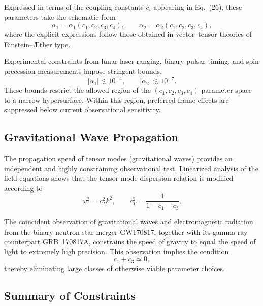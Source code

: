 \documentclass[11pt]{article}
\begin{document}
        Expressed in terms of the coupling constants $c_i$ appearing in
        Eq.~(26), these parameters take the schematic form
        \begin{equation}
            \alpha_1 = \alpha_1(c_1,c_2,c_3,c_4), \qquad
            \alpha_2 = \alpha_2(c_1,c_2,c_3,c_4),
        \end{equation}
        where the explicit expressions follow those obtained in vector--tensor
        theories of Einstein--Æther type.

        Experimental constraints from lunar laser ranging, binary pulsar timing, and
        spin precession measurements impose stringent bounds,
        \begin{equation}
            |\alpha_1| \lesssim 10^{-4}, \qquad
            |\alpha_2| \lesssim 10^{-7}.
        \end{equation}
        These bounds restrict the allowed region of the $(c_1,c_2,c_3,c_4)$ parameter
        space to a narrow hypersurface.
        Within this region, preferred-frame effects are suppressed below current
        observational sensitivity.

    \subsection{Gravitational Wave Propagation}

        The propagation speed of tensor modes (gravitational waves) provides an
        independent and highly constraining observational test.
        Linearized analysis of the field equations shows that the tensor-mode dispersion
        relation is modified according to
        \begin{equation}
            \omega^2 = c_T^2 k^2, \qquad
            c_T^2 = \frac{1}{1 - c_1 - c_3}.
        \end{equation}

        The coincident observation of gravitational waves and electromagnetic radiation
        from the binary neutron star merger GW170817, together with its gamma-ray
        counterpart GRB~170817A, constrains the speed of gravity to equal the speed of
        light to extremely high precision.
        This observation implies the condition
        \begin{equation}
            c_1 + c_3 \simeq 0,
        \end{equation}
        thereby eliminating large classes of otherwise viable parameter choices.

    \subsection{Summary of Constraints}
\end{document}
